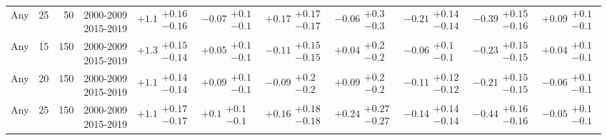 \begin{table}[H]
\begin{tabular}{lrrllllllll}
Any & 25 & 50 & \makecell{2000-2009 \\ 2015-2019} & $\bm{+1.1}\substack{+0.16 \\ -0.16}$ & $-0.07\substack{+0.1 \\ -0.1}$ & $\bm{+0.17}\substack{+0.17 \\ -0.17}$ & $-0.06\substack{+0.3 \\ -0.3}$ & $\bm{-0.21}\substack{+0.14 \\ -0.14}$ & $\bm{-0.39}\substack{+0.15 \\ -0.16}$ & $+0.09\substack{+0.1 \\ -0.1}$ \\
Any & 15 & 150 & \makecell{2000-2009 \\ 2015-2019} & $\bm{+1.3}\substack{+0.15 \\ -0.14}$ & $+0.05\substack{+0.1 \\ -0.1}$ & $-0.11\substack{+0.15 \\ -0.15}$ & $+0.04\substack{+0.2 \\ -0.2}$ & $-0.06\substack{+0.1 \\ -0.1}$ & $\bm{-0.23}\substack{+0.15 \\ -0.15}$ & $+0.04\substack{+0.1 \\ -0.1}$ \\
Any & 20 & 150 & \makecell{2000-2009 \\ 2015-2019} & $\bm{+1.1}\substack{+0.14 \\ -0.14}$ & $+0.09\substack{+0.1 \\ -0.1}$ & $-0.09\substack{+0.2 \\ -0.2}$ & $+0.09\substack{+0.2 \\ -0.2}$ & $-0.11\substack{+0.12 \\ -0.12}$ & $\bm{-0.21}\substack{+0.15 \\ -0.15}$ & $-0.06\substack{+0.1 \\ -0.1}$ \\
Any & 25 & 150 & \makecell{2000-2009 \\ 2015-2019} & $\bm{+1.1}\substack{+0.17 \\ -0.17}$ & $+0.1\substack{+0.1 \\ -0.1}$ & $+0.16\substack{+0.18 \\ -0.18}$ & $+0.24\substack{+0.27 \\ -0.27}$ & $\bm{-0.14}\substack{+0.14 \\ -0.14}$ & $\bm{-0.44}\substack{+0.16 \\ -0.16}$ & $-0.05\substack{+0.1 \\ -0.1}$ \\
\bottomrule
\end{tabular}\normalsize\renewcommand{\arraystretch}{1}
\end{table}


